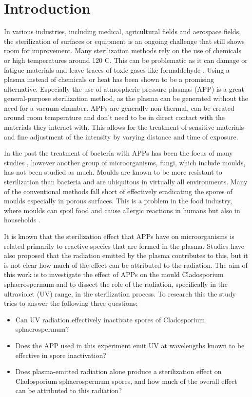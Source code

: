 \chapter{Introduction}
\label{chap:intro}
In various industries, including medical, agricultural fields and aerospace fields, the sterilization of surfaces or equipment is an ongoing challenge that still shows room for improvement. Many sterilization methods rely on the use of chemicals or high temperatures around 120 \textdegree C. This can be problematic as it can damage or fatigue materials and leave traces of toxic gases like formaldehyde \cite{app_study}. Using a plasma instead of chemicals or heat has been shown to be a promising alternative. Especially the use of atmospheric pressure plasmas (APP) is a great general-purpose sterilization method, as the plasma can be generated without the need for a vacuum chamber. APPs are generally non-thermal, can be created around room temperature and don't need to be in direct contact with the materials they interact with. This allows for the treatment of sensitive materials and fine adjustment of the intensity by varying distance and time of exposure. 

In the past the treatment of bacteria with APPs has been the focus of many studies \cite{app_study,bacteria}, however another group of microorganisms, fungi, which include moulds, has not been studied as much. Moulds are known to be more resistant to sterilization than bacteria and are ubiquitous in virtually all environments. Many of the conventional methods fall short of effectively eradicating the spores of moulds especially in porous surfaces. This is a problem in the food industry, where moulds can spoil food and cause allergic reactions in humans but also in households \cite{mould, growth}.

It is known that the sterilization effect that APPs have on microorganisms is related primarily to reactive species that are formed in the plasma. Studies have also proposed that the radiation emitted by the plasma contributes to this, but it is not clear how much of the effect can be attributed to the radiation. The aim of this work is to investigate the effect of APPs on the mould Cladosporium sphaerospermum and to dissect the role of the radiation, specifically in the ultraviolet (UV) range, in the sterilization process. To research this the study tries to answer the following three questions:
\begin{itemize}
    \item Can UV radiation effectively inactivate spores of Cladosporium sphaerospermum?
    \item Does the APP used in this experiment emit UV at wavelengths known to be effective in spore inactivation?
    \item Does plasma-emitted radiation alone produce a sterilization effect on Cladosporium sphaerospermum spores, and how much of the overall effect can be attributed to this radiation?
\end{itemize}

